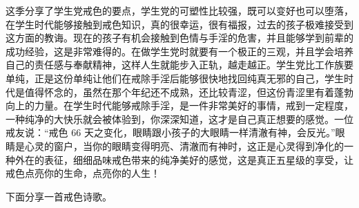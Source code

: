 这季分享了学生党戒色的要点，学生党的可塑性比较强，既可以变好也可以堕落，在学生时代能够接触到戒色知识，真的很幸运，很有福报，过去的孩子极难接受到这方面的教诲。现在的孩子有机会接触到色情与手淫的危害，并且能够学到前辈的成功经验，这是非常难得的。在做学生党时就要有一个极正的三观，并且学会培养自己的责任感与奉献精神，这样人生就能步入正轨，越走越正。学生党比工作族要单纯，正是这份单纯让他们在戒除手淫后能够很快地找回纯真无邪的自己，学生时代是值得怀念的，虽然在那个年纪还不成熟，还比较青涩，但这份青涩里有着蓬勃向上的力量。在学生时代能够戒除手淫，是一件非常美好的事情，戒到一定程度，一种纯净的大快乐就会被体验到，你深深知道，这才是自己真正想要的感觉。一位戒友说：“戒色 66 天之变化，眼睛跟小孩子的大眼睛一样清澈有神，会反光。”眼睛是心灵的窗户，当你的眼睛变得明亮、清澈而有神时，这正是心灵得到净化的一种外在的表征，细细品味戒色带来的纯净美好的感觉，这是真正五星级的享受，让戒色点亮你的生命，点亮你的人生！

下面分享一首戒色诗歌。


